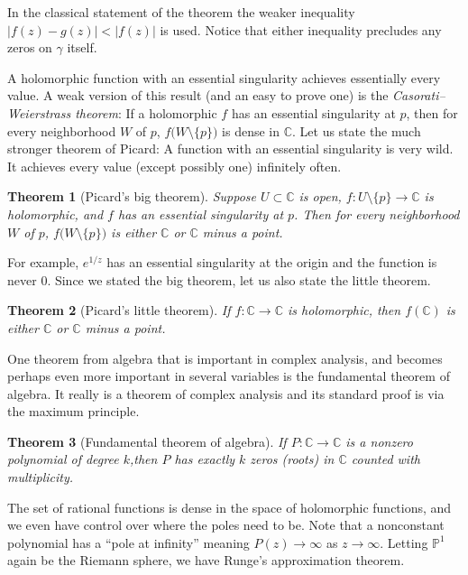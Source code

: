 \documentclass[12pt,openany]{book}
\newcommand{\sabs}[1]{\lvert {#1} \rvert}
\newcommand{\C}{{\mathbb{C}}}
\newcommand{\bP}{{\mathbb{P}}}
\newcommand{\myindex}[1]{#1\index{#1}}
\theoremstyle{plain}
\newtheorem{thm}{Theorem}[section]
\theoremstyle{remark}
\theoremstyle{definition}
\theoremstyle{exercise}
\theoremstyle{example}
\begin{document}
In the classical statement of the theorem the weaker
inequality $\sabs{f(z)-g(z)} < \sabs{f(z)}$ is used.
Notice that either inequality precludes any zeros on $\gamma$ itself.

A holomorphic function with an essential singularity achieves essentially
every value.  A weak version of this result (and an easy to prove one)
is the \emph{\myindex{Casorati--Weierstrass theorem}}:
If a holomorphic $f$ has an essential singularity at $p$,
then for every neighborhood $W$ of $p$, $f\bigl(W \setminus \{p\}\bigr)$ is dense in
$\C$.  Let us state the much stronger theorem of Picard:
A function with an essential singularity is very wild.
It achieves every value (except possibly one) infinitely often.

\begin{thm}[Picard's big theorem]
Suppose $U \subset \C$ is open, $f \colon U \setminus \{ p \} \to \C$
is holomorphic, and $f$ has an essential singularity at $p$.  Then for every
neighborhood $W$ of $p$, $f\bigl(W \setminus \{ p \}\bigr)$ is either $\C$
or $\C$ minus a point.
\end{thm}

For example, $e^{1/z}$ has an essential singularity at the origin
and the function is never $0$.
Since we stated the big theorem, let us also state the little theorem.

\begin{thm}[Picard's little theorem]
If $f \colon \C \to \C$ is holomorphic,
then
$f(\C)$ is either $\C$ or $\C$ minus a point.
\end{thm}


One theorem from algebra that is important in complex analysis, and becomes
perhaps even more important in several variables is the fundamental theorem
of algebra.  It really is a theorem of complex analysis and its standard
proof is via the maximum principle.

\begin{thm}[Fundamental theorem of algebra]
\label{thm:fundamentalthmalg}%
If $P \colon \C \to \C$ is a nonzero polynomial of degree $k$,\linebreak[2]
then $P$
has exactly $k$ zeros (roots) in $\C$ counted with multiplicity.
\end{thm}

The set of rational functions is dense in the space of holomorphic
functions, and we even have control over where the poles need to be.
Note that a nonconstant polynomial has a ``pole at infinity'' meaning
$P(z) \to \infty$ as $z \to \infty$.  Letting $\bP^1$ again be the Riemann
sphere, we have Runge's approximation theorem.
\end{document}
